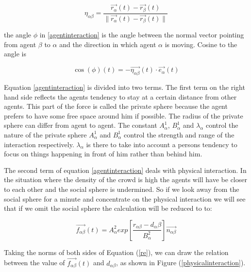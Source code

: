 \begin{equation}
    \eta_{\alpha \beta} =
        \frac{\vec{r_{\alpha}}(t) - \vec{r_{\beta}}(t)}
             {\|\vec{r_{\alpha}}(t) - \vec{r_{\beta}}(t) \|}
\end{equation}

the angle $\phi$ in \eqref{agentinteraction} is the angle between the normal 
vector pointing from agent $\beta$ to $\alpha$ and the direction in which 
agent $\alpha$ is moving. Cosine to the angle is 

\begin{equation}
\cos \left( \phi \right)
	\left( t \right) 
		= 
	- \vec{\eta_{\alpha \beta}}
		\left( t \right) 
	\cdot 
\vec{e_{\alpha}}\left( t \right)
\end{equation}

Equation \eqref{agentinteraction} is divided into two terms. The first term on 
the right hand side reflects the agents tendency to stay at a certain distance 
from other agents. This part of the force is called the private sphere because 
the agent prefers to have some free space around him if possible. The radius 
of the private sphere can differ from agent to agent. The constant 
$A_{\alpha}^{1}$, $B_{\alpha}^{1}$ and $\lambda_{\alpha}$ control the nature 
of the private sphere $A_{\alpha}^1$ and $B_{\alpha}^1$ control the strength 
and range of the interaction respectively. $\lambda_{\alpha}$ is there to take 
into account a persons tendency to focus on things happening in front of him 
rather than behind him.	%

The second term of equation \eqref{agentinteraction} deals with physical interaction.
In the situation where the density of the crowd is high the agents will have be closer
to each other and the social sphere is undermined. %
So if we look away from the social sphere for a minute and concentrate on the physical
interaction we will see that if we omit the social sphere the calculation will be reduced to
to:

\begin{equation}\label{re}
\overrightarrow{f_{\alpha\beta}}(t) = A_{\alpha}^{2} exp\left[ \frac{r_{\alpha\beta} - d_{\alpha}\beta}{B_{\alpha}^{2}}\right]  \overrightarrow{n_{\alpha\beta}}
\end{equation}

Taking the norms of both sides of Equation (\ref{re}), we can draw the relation between the value of $\overrightarrow{f_{\alpha\beta}}(t)$ and $ d_{\alpha\beta} $, as shown in Figure 
(\ref{physicalinteraction}).\\

